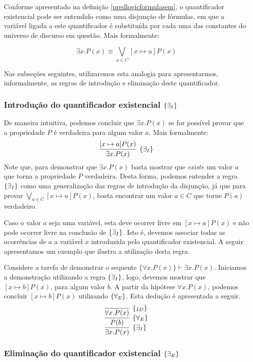 Conforme apresentado na definição \ref{predlogicformulasem}, o
quantificador existencial pode ser entendido como uma disjunção de
fórmulas, em que a variável ligada a este quantificador é substituída
por cada uma das constantes do universo de discurso em questão. Mais
formalmente:

\[\exists x. P(x) \equiv \bigvee\limits_{u\in C}[x\mapsto u]P(x)\]

Nas subseções seguintes, utilizaremos esta analogia para
apresentarmos, informalmente, as regras de introdução e eliminação
deste quantificador.

\subsubsection{Introdução do quantificador existencial $\scriptsize{\{\exists_I}\}$}

De maneira intuitiva, podemos concluir que $\exists x. P(x)$ se for
possível provar que a propriedade $P$ é verdadeira para algum valor
$a$. Mais formalmente:
\[
\infer[\existsI]{\exists x. P(x)}
         {
           [x\mapsto a]P(x)
         }
\]
Note que, para demonstrar que $\exists x. P(x)$ basta mostrar que
\emph{existe} um valor $a$ que torna a propriedade $P$
verdadeira. Desta forma, podemos entender a regra $\scriptsize{\{\exists_I}\}$ como uma
generalização das regras de introdução da disjunção, já que para
provar $\bigvee_{u\in C}  [x\mapsto u]P(x)$, basta encontrar um valor
$a \in C$ que torne $P(a)$ verdadeiro.

Caso o valor $a$ seja uma variável, esta deve ocorrer livre em
$[x\mapsto a]P(x)$ e não pode ocorrer livre na conclusão de $\scriptsize{\{\exists_I}\}$. Isto
é, devemos associar todas as ocorrências de $a$ a variável $x$
introduzida pelo quantificador existencial. A seguir apresentamos um exemplo que ilustra a
utilização desta regra.
\begin{Example}
Considere a tarefa de demonstrar o sequente $\{\forall x. P(x)\}
\vdash \exists x. P(x)$. Iniciamos a demonstração utilizando a regra
$\scriptsize{\{\exists_I}\}$, logo, devemos mostrar que $[x\mapsto b]P(x)$, para algum
valor $b$. A partir da hipótese $\forall x .P(x)$, podemos concluir
$[x\mapsto b]P(x)$ utilizando $\scriptsize{\{\forall_E}\}$. Esta dedução é apresentada a
seguir.
\[
\infer[\existsI]{\exists x. P(x)}
        {
          \infer[\forallE]{P(b)}
                   {
                     \infer[\Id]{\forall x. P(x)}{}
                   }
        }
\]
\end{Example}

\subsubsection{Eliminação do quantificador existencial $\scriptsize{\{\exists_E}\}$}

